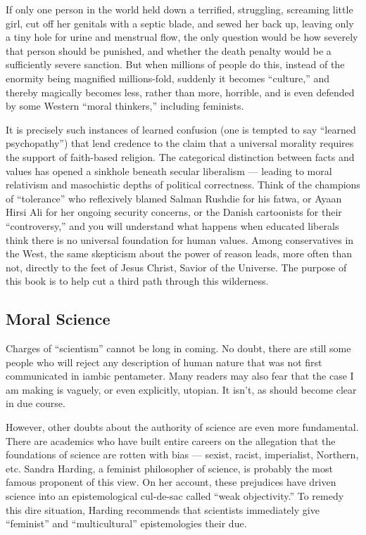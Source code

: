\documentclass[a4paper,14pt]{extarticle}
\begin{document}
If only one person in the world held down a terrified, struggling, screaming little girl, cut off her genitals with a septic blade, and sewed her back up, leaving only a tiny hole for urine and menstrual flow, the only question would be how severely that person should be punished, and whether the death penalty would be a sufficiently severe sanction.
But when millions of people do this, instead of the enormity being magnified millions-fold, suddenly it becomes ``culture,'' and thereby magically becomes less, rather than more, horrible, and is even defended by some Western ``moral thinkers,'' including feminists.

It is precisely such instances of learned confusion (one is tempted to say ``learned psychopathy'') that lend credence to the claim that a universal morality requires the support of faith-based religion.
The categorical distinction between facts and values has opened a sinkhole beneath secular liberalism --- leading to moral relativism and masochistic depths of political correctness.
Think of the champions of ``tolerance'' who reflexively blamed Salman Rushdie for his fatwa, or Ayaan Hirsi Ali for her ongoing security concerns, or the Danish cartoonists for their ``controversy,'' and you will understand what happens when educated liberals think there is no universal foundation for human values.
Among conservatives in the West, the same skepticism about the power of reason leads, more often than not, directly to the feet of Jesus Christ, Savior of the Universe.
The purpose of this book is to help cut a third path through this wilderness.

\subsection{Moral Science}

Charges of ``scientism'' cannot be long in coming.
No doubt, there are still some people who will reject any description of human nature that was not first communicated in iambic pentameter.
Many readers may also fear that the case I am making is vaguely, or even explicitly, utopian.
It isn't, as should become clear in due course.

However, other doubts about the authority of science are even more fundamental.
There are academics who have built entire careers on the allegation that the foundations of science are rotten with bias --- sexist, racist, imperialist, Northern, etc.
Sandra Harding, a feminist philosopher of science, is probably the most famous proponent of this view.
On her account, these prejudices have driven science into an epistemological cul-de-sac called ``weak objectivity.''
To remedy this dire situation, Harding recommends that scientists immediately give ``feminist'' and ``multicultural'' epistemologies their due.
\end{document}
